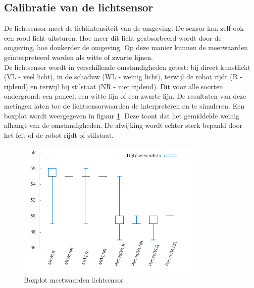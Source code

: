 \documentclass[tt3]{penoverslag}
\begin{document}
\subsection{Calibratie van de lichtsensor} %
\label{ssec:calibLS}
De lichtsensor meet de lichtintensiteit van de omgeving. De sensor kan zelf ook een rood licht uitsturen. Hoe meer dit licht geabsorbeerd wordt door de omgeving, hoe donkerder de omgeving. Op deze manier kunnen de meetwaarden ge\"interpreteerd worden als witte of zwarte lijnen.\\
De lichtsensor wordt in verschillende omstandigheden getest: bij direct kunstlicht (VL - veel licht), in de schaduw (WL - weinig licht), terwijl de robot rijdt (R - rijdend) en terwijl hij stilstaat (NR - niet rijdend). Dit voor alle soorten ondergrond: een paneel, een witte lijn of een zwarte lijn. De resultaten van deze metingen laten toe de lichtsensorwaarden de interpreteren en te simuleren. Een boxplot wordt weergegeven in figuur \ref{fig:boxLicht}. Deze toont dat het gemiddelde weinig afhangt van de omstandigheden. De afwijking wordt echter sterk bepaald door het feit of de robot rijdt of stilstaat.

\begin{figure}[tbp]
\begin{center}
    \includegraphics[width=0.8\textwidth]{boxplotLichtSensor}
    \caption{Boxplot meetwaarden lichtsensor}
    \label{fig:boxLicht}
\end{center}
\end{figure}
\end{document}
